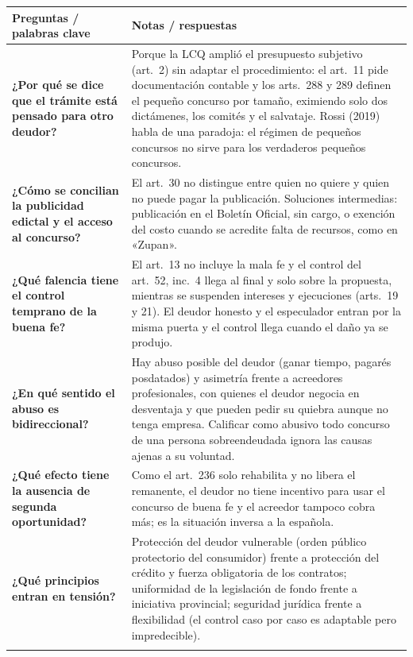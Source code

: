 \documentclass[12pt,oneside]{book}
\makeatletter
\newenvironment{cornell}{%
  \renewcommand{\arraystretch}{1.2}%
  \begin{longtable}{@{}>{\raggedright\arraybackslash}p{0.27\textwidth}|>{\raggedright\arraybackslash}p{0.65\textwidth}@{}}
  \toprule
  \textbf{Preguntas / palabras clave} & \textbf{Notas / respuestas} \\
  \midrule
  \endhead
}{%
  \bottomrule
  \end{longtable}%
}
\makeatother
\begin{document}
\begin{cornell}
\textbf{¿Por qué se dice que el trámite está pensado para otro deudor?} &
Porque la LCQ amplió el presupuesto subjetivo (art.~2) sin adaptar el procedimiento: el art.~11 pide documentación contable y los arts.~288 y 289 definen el pequeño concurso por tamaño, eximiendo solo dos dictámenes, los comités y el salvataje. Rossi (2019) habla de una paradoja: el régimen de pequeños concursos no sirve para los verdaderos pequeños concursos. \\
\addlinespace

\textbf{¿Cómo se concilian la publicidad edictal y el acceso al concurso?} &
El art.~30 no distingue entre quien no quiere y quien no puede pagar la publicación. Soluciones intermedias: publicación en el Boletín Oficial, sin cargo, o exención del costo cuando se acredite falta de recursos, como en «Zupan». \\
\addlinespace

\textbf{¿Qué falencia tiene el control temprano de la buena fe?} &
El art.~13 no incluye la mala fe y el control del art.~52, inc.~4 llega al final y solo sobre la propuesta, mientras se suspenden intereses y ejecuciones (arts.~19 y 21). El deudor honesto y el especulador entran por la misma puerta y el control llega cuando el daño ya se produjo. \\
\addlinespace

\textbf{¿En qué sentido el abuso es bidireccional?} &
Hay abuso posible del deudor (ganar tiempo, pagarés posdatados) y asimetría frente a acreedores profesionales, con quienes el deudor negocia en desventaja y que pueden pedir su quiebra aunque no tenga empresa. Calificar como abusivo todo concurso de una persona sobreendeudada ignora las causas ajenas a su voluntad. \\
\addlinespace

\textbf{¿Qué efecto tiene la ausencia de segunda oportunidad?} &
Como el art.~236 solo rehabilita y no libera el remanente, el deudor no tiene incentivo para usar el concurso de buena fe y el acreedor tampoco cobra más; es la situación inversa a la española. \\
\addlinespace

\textbf{¿Qué principios entran en tensión?} &
Protección del deudor vulnerable (orden público protectorio del consumidor) frente a protección del crédito y fuerza obligatoria de los contratos; uniformidad de la legislación de fondo frente a iniciativa provincial; seguridad jurídica frente a flexibilidad (el control caso por caso es adaptable pero impredecible). \\
\addlinespace


\end{cornell}
\end{document}
